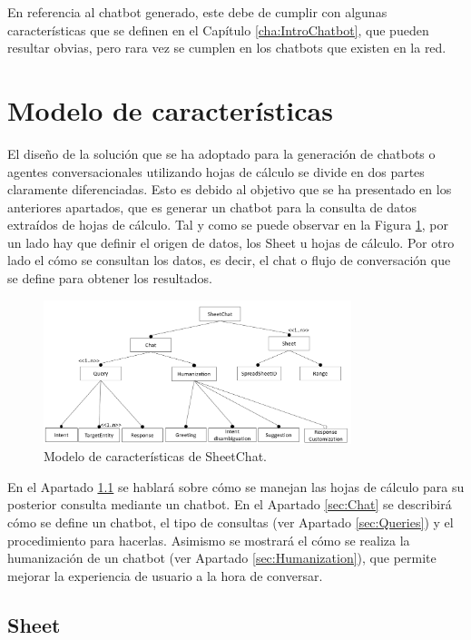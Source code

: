 En referencia al chatbot generado, este debe de cumplir con algunas características que se definen en el Capítulo \ref{cha:IntroChatbot}, que pueden resultar obvias, pero rara vez se cumplen en los chatbots que existen en la red.

\section{Modelo de características}
\label{sec:FeatureModel}

El diseño de la solución que se ha adoptado para la generación de chatbots o agentes conversacionales utilizando hojas de cálculo se divide en dos partes claramente diferenciadas. Esto es debido al objetivo que se ha presentado en los anteriores apartados, que es generar un chatbot para la consulta de datos extraídos de hojas de cálculo. Tal y como se puede observar en la Figura \ref{fig:FeatureModel}, por un lado hay que definir el origen de datos, los Sheet u hojas de cálculo. Por otro lado el cómo se consultan los datos, es decir, el chat o flujo de conversación que se define para obtener los resultados.


\begin{figure}[htb]
	\centering
	\includegraphics[width=0.8\textwidth]{./figs/FeatureModel.png}
	\caption{Modelo de características de SheetChat.}
	\label{fig:FeatureModel}
\end{figure}

En el Apartado \ref{sec:Sheet} se hablará sobre cómo se manejan las hojas de cálculo para su posterior consulta mediante un chatbot. En el Apartado \ref{sec:Chat} se describirá cómo se define un chatbot, el tipo de consultas (ver Apartado \ref{sec:Queries}) y el procedimiento para hacerlas. Asimismo se mostrará el cómo se realiza la humanización de un chatbot (ver Apartado \ref{sec:Humanization}), que permite mejorar la experiencia de usuario a la hora de conversar.

\subsection{Sheet}
\label{sec:Sheet}

